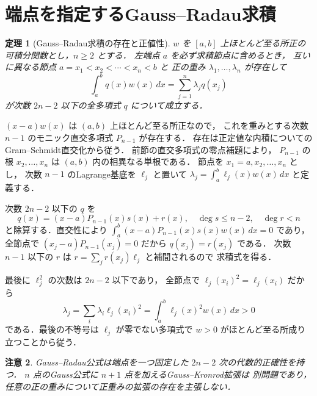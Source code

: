 \documentclass[a5paper,10pt,onecolumn]{jsarticle}
\makeatletter
\theoremstyle{mathnotetheorem}
\newtheorem{theorem}{定理}[section]
\newtheorem{remark}[theorem]{注意}
\renewcommand{\proofname}{証明}
\renewenvironment{proof}[1][\proofname]{%
  \par\pushQED{\qed}\normalfont\topsep4\p@\@plus2\p@\relax
  \trivlist\item[\hskip\labelsep\bfseries #1]\ignorespaces
}{\popQED\endtrivlist\@endpefalse}
\makeatother
\begin{document}
\section{端点を指定するGauss--Radau求積}
\begin{theorem}[Gauss--Radau求積の存在と正値性]
$w$ を $[a,b]$ 上ほとんど至る所正の可積分関数とし，$n\ge2$ とする．
左端点 $a$ を必ず求積節点に含めるとき，
互いに異なる節点 $a=x_1<x_2<\cdots<x_n<b$ と
正の重み $\lambda_1,\ldots,\lambda_n$ が存在して
\[
 \int_a^b q(x)w(x)\,dx=\sum_{j=1}^n\lambda_j q(x_j)
\]
が次数 $2n-2$ 以下の全多項式 $q$ について成立する．
\end{theorem}
\begin{proof}
$(x-a)w(x)$ は $(a,b)$ 上ほとんど至る所正なので，
これを重みとする次数 $n-1$ のモニック直交多項式 $P_{n-1}$ が存在する．
存在は正定値な内積についてのGram--Schmidt直交化から従う．
前節の直交多項式の零点補題により，
$P_{n-1}$ の根 $x_2,\ldots,x_n$ は
$(a,b)$ 内の相異なる単根である．
節点を $x_1=a,x_2,\ldots,x_n$ とし，
次数 $n-1$ のLagrange基底を $\ell_j$ と置いて
$\lambda_j=\int_a^b\ell_j(x)w(x)\,dx$ と定義する．

次数 $2n-2$ 以下の $q$ を
\[
 q(x)=(x-a)P_{n-1}(x)s(x)+r(x),
 \quad\deg s\le n-2,\quad\deg r<n
\]
と除算する．直交性により
$\int_a^b(x-a)P_{n-1}(x)s(x)w(x)\,dx=0$ であり，
全節点で $(x_j-a)P_{n-1}(x_j)=0$ だから
$q(x_j)=r(x_j)$ である．
次数 $n-1$ 以下の $r$ は
$r=\sum_jr(x_j)\ell_j$ と補間されるので
求積式を得る．

最後に $\ell_j^2$ の次数は $2n-2$ 以下であり，
全節点で $\ell_j(x_i)^2=\ell_j(x_i)$ だから
\[
 \lambda_j=\sum_i\lambda_i\ell_j(x_i)^2
 =\int_a^b\ell_j(x)^2w(x)\,dx>0
\]
である．最後の不等号は $\ell_j$ が零でない多項式で
$w>0$ がほとんど至る所成り立つことから従う．
\end{proof}
\begin{remark}
Gauss--Radau公式は端点を一つ固定した $2n-2$ 次の代数的正確性を持つ．
$n$ 点のGauss公式に $n+1$ 点を加えるGauss--Kronrod拡張は
別問題であり，任意の正の重みについて正重みの拡張の存在を主張しない．
\end{remark}
\end{document}
